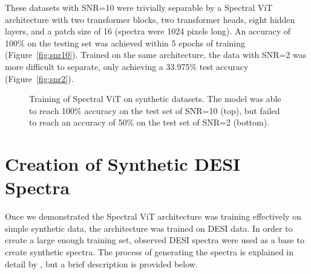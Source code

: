 These datasets with SNR=10 were trivially separable by a Spectral ViT architecture 
with two transformer blocks, two transformer heads, eight hidden layers, and a patch size of 16 (spectra were 1024 pixels long). 
An accuracy of 100\% on the testing set was achieved within 5 epochs of training (Figure~\ref{fig:snr10}). Trained on the same 
architecture, the data with SNR=2 was more difficult to separate, only achieving a 33.975\% test accuracy (Figure~\ref{fig:snr2}).



\begin{figure}[t]
    \centering
    \qquad
    \caption[Verification of ViT: Synthetic Dataset]{Training of Spectral ViT on synthetic datasets. The model was able to reach 100\% accuracy on the test set of SNR=10 (top), 
    but failed to reach an accuracy of 50\% on the test set of SNR=2 (bottom).}
\label{fig:synth_spectra_training}
\end{figure}



\section{Creation of Synthetic DESI Spectra}
\label{sec:synth_data}
Once we demonstrated the Spectral ViT architecture was training effectively on simple synthetic data,
the architecture was trained on DESI data. In order to create a large enough training 
set, observed DESI spectra were used as a base to create synthetic spectra. The process of 
generating the spectra is explained in detail by \textcite{Sepeku2022}, but a brief 
description is provided below. 

